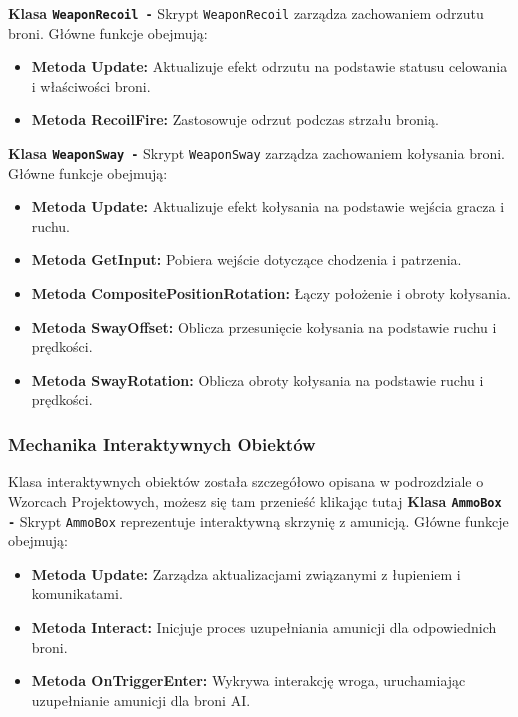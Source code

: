 \textbf{Klasa \texttt{WeaponRecoil -}}
Skrypt \texttt{WeaponRecoil} zarządza zachowaniem odrzutu broni. Główne funkcje obejmują:
\begin{itemize}
  \item \textbf{Metoda Update:} Aktualizuje efekt odrzutu na podstawie statusu celowania i właściwości broni.
  \item \textbf{Metoda RecoilFire:} Zastosowuje odrzut podczas strzału bronią.
\end{itemize}

\textbf{Klasa \texttt{WeaponSway -}}
Skrypt \texttt{WeaponSway} zarządza zachowaniem kołysania broni. Główne funkcje obejmują:
\begin{itemize}
  \item \textbf{Metoda Update:} Aktualizuje efekt kołysania na podstawie wejścia gracza i ruchu.
  \item \textbf{Metoda GetInput:} Pobiera wejście dotyczące chodzenia i patrzenia.
  \item \textbf{Metoda CompositePositionRotation:} Łączy położenie i obroty kołysania.
  \item \textbf{Metoda SwayOffset:} Oblicza przesunięcie kołysania na podstawie ruchu i prędkości.
  \item \textbf{Metoda SwayRotation:} Oblicza obroty kołysania na podstawie ruchu i prędkości.
\end{itemize}

\subsubsection{Mechanika Interaktywnych Obiektów}

Klasa interaktywnych obiektów została szczegółowo opisana w podrozdziale o Wzorcach Projektowych, możesz się tam przenieść klikając tutaj 
\textbf{Klasa \texttt{AmmoBox -}}
Skrypt \texttt{AmmoBox} reprezentuje interaktywną skrzynię z amunicją. Główne funkcje obejmują:
\begin{itemize}
  \item \textbf{Metoda Update:} Zarządza aktualizacjami związanymi z łupieniem i komunikatami.
  \item \textbf{Metoda Interact:} Inicjuje proces uzupełniania amunicji dla odpowiednich broni.
  \item \textbf{Metoda OnTriggerEnter:} Wykrywa interakcję wroga, uruchamiając uzupełnianie amunicji dla broni AI.
\end{itemize}

